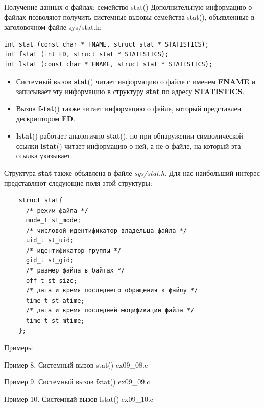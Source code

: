 \documentclass[xcolor=table]{beamer}
\begin{document}
\begin{frame}[fragile]{Получение данных о файлах: семейство stat()}
	Дополнительную информацию о файлах позволяют получить системные вызовы семейства stat(), объявленные в заголовочном файле sys/stat.h:
	\begin{verbatim}
int stat (const char * FNAME, struct stat * STATISTICS);
int fstat (int FD, struct stat * STATISTICS);
int lstat (const char * FNAME, struct stat * STATISTICS);
	\end{verbatim}
	\begin{itemize}
		\item Системный вызов \textbf{stat}() читает информацию о файле с именем \textbf{FNAME} и записывает эту информацию в структуру \textbf{stat} по адресу \textbf{STATISTICS}. 
		\item Вызов \textbf{fstat}() также читает информацию о файле, который представлен дескриптором \textbf{FD}. 
		\item \textbf{lstat}() работает аналогично \textbf{stat}(), но при обнаружении символической ссылки \textbf{lstat}() читает информацию о ней, а не о файле, на который эта ссылка указывает.
	\end{itemize}
\end{frame}

\begin{frame}[fragile]
	Структура \textbf{stat} также объявлена в файле \textit{sys/stat.h}. Для нас наибольший интерес представляют следующие поля этой структуры:
	\begin{verbatim}
	struct stat{
	  /* режим файла */
	  mode_t st_mode; 
	  /* числовой идентификатор владельца файла */
	  uid_t st_uid; 
	  /* идентификатор группы */
	  gid_t st_gid; 
	  /* размер файла в байтах */
	  off_t st_size; 
	  /* дата и время последнего обращения к файлу */
	  time_t st_atime; 
	  /* дата и время последней модификации файла */
	  time_t st_mtime; 
	};
	\end{verbatim}
\end{frame}

\begin{frame}[fragile]{Примеры}
	\begin{block}{Пример 8. Системный вызов stat()}
		ex09\_08.c
	\end{block}
	\begin{block}{Пример 9. Системный вызов fstat()}
		ex09\_09.c
	\end{block}
	\begin{block}{Пример 10. Системный вызов lstat() }
		ex09\_10.c
	\end{block}
\end{frame}
\end{document}

